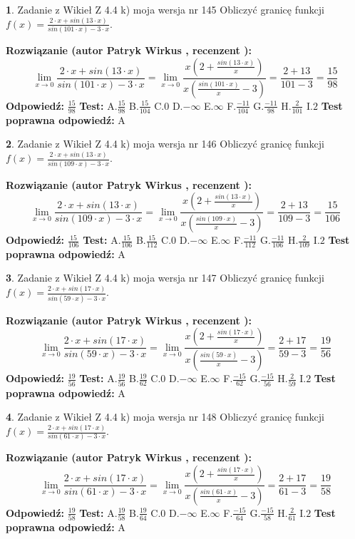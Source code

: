 \documentclass[12pt, a4paper]{article}
\theoremstyle{definition} %
\newtheorem{zad}{}
\newcommand{\zadStart}[1]{\begin{zad}#1\newline}
\newcommand{\zadStop}{\end{zad}}
\newcommand{\rozwStart}[2]{\noindent \textbf{Rozwiązanie (autor #1 , recenzent #2): }\newline}
\newcommand{\rozwStop}{\newline}
\newcommand{\odpStart}{\noindent \textbf{Odpowiedź:}\newline}
\newcommand{\odpStop}{\newline}
\newcommand{\testStart}{\noindent \textbf{Test:}\newline}
\newcommand{\testStop}{\newline}
\newcommand{\kluczStart}{\noindent \textbf{Test poprawna odpowiedź:}\newline}
\newcommand{\kluczStop}{\newline}
\begin{document}
\zadStart{Zadanie z Wikieł Z 4.4 k) moja wersja nr 145}
Obliczyć granicę funkcji $f(x)=\frac{2\cdot x +sin(13\cdot x)}{sin(101\cdot x) -3\cdot x}$.
\zadStop
\rozwStart{Patryk Wirkus}{}
$$\lim\limits_{x\to 0}\frac{2\cdot x +sin(13\cdot x)}{sin(101\cdot x) -3\cdot x}
=\lim\limits_{x\to 0}\frac{x(2+\frac{sin(13\cdot x)}{x})}{x(\frac{sin(101\cdot x)}{x}-3)}
=\frac{2+13}{101-3} = \frac{15}{98}$$
\rozwStop
\odpStart
$\frac{15}{98}$
\odpStop
\testStart
A.$\frac{15}{98}$
B.$\frac{15}{104}$
C.$0$
D.$-\infty$
E.$\infty$
F.$\frac{-11}{104}$
G.$\frac{-11}{98}$
H.$\frac{2}{101}$
I.$2$
\testStop
\kluczStart
A
\kluczStop



\zadStart{Zadanie z Wikieł Z 4.4 k) moja wersja nr 146}
Obliczyć granicę funkcji $f(x)=\frac{2\cdot x +sin(13\cdot x)}{sin(109\cdot x) -3\cdot x}$.
\zadStop
\rozwStart{Patryk Wirkus}{}
$$\lim\limits_{x\to 0}\frac{2\cdot x +sin(13\cdot x)}{sin(109\cdot x) -3\cdot x}
=\lim\limits_{x\to 0}\frac{x(2+\frac{sin(13\cdot x)}{x})}{x(\frac{sin(109\cdot x)}{x}-3)}
=\frac{2+13}{109-3} = \frac{15}{106}$$
\rozwStop
\odpStart
$\frac{15}{106}$
\odpStop
\testStart
A.$\frac{15}{106}$
B.$\frac{15}{112}$
C.$0$
D.$-\infty$
E.$\infty$
F.$\frac{-11}{112}$
G.$\frac{-11}{106}$
H.$\frac{2}{109}$
I.$2$
\testStop
\kluczStart
A
\kluczStop



\zadStart{Zadanie z Wikieł Z 4.4 k) moja wersja nr 147}
Obliczyć granicę funkcji $f(x)=\frac{2\cdot x +sin(17\cdot x)}{sin(59\cdot x) -3\cdot x}$.
\zadStop
\rozwStart{Patryk Wirkus}{}
$$\lim\limits_{x\to 0}\frac{2\cdot x +sin(17\cdot x)}{sin(59\cdot x) -3\cdot x}
=\lim\limits_{x\to 0}\frac{x(2+\frac{sin(17\cdot x)}{x})}{x(\frac{sin(59\cdot x)}{x}-3)}
=\frac{2+17}{59-3} = \frac{19}{56}$$
\rozwStop
\odpStart
$\frac{19}{56}$
\odpStop
\testStart
A.$\frac{19}{56}$
B.$\frac{19}{62}$
C.$0$
D.$-\infty$
E.$\infty$
F.$\frac{-15}{62}$
G.$\frac{-15}{56}$
H.$\frac{2}{59}$
I.$2$
\testStop
\kluczStart
A
\kluczStop



\zadStart{Zadanie z Wikieł Z 4.4 k) moja wersja nr 148}
Obliczyć granicę funkcji $f(x)=\frac{2\cdot x +sin(17\cdot x)}{sin(61\cdot x) -3\cdot x}$.
\zadStop
\rozwStart{Patryk Wirkus}{}
$$\lim\limits_{x\to 0}\frac{2\cdot x +sin(17\cdot x)}{sin(61\cdot x) -3\cdot x}
=\lim\limits_{x\to 0}\frac{x(2+\frac{sin(17\cdot x)}{x})}{x(\frac{sin(61\cdot x)}{x}-3)}
=\frac{2+17}{61-3} = \frac{19}{58}$$
\rozwStop
\odpStart
$\frac{19}{58}$
\odpStop
\testStart
A.$\frac{19}{58}$
B.$\frac{19}{64}$
C.$0$
D.$-\infty$
E.$\infty$
F.$\frac{-15}{64}$
G.$\frac{-15}{58}$
H.$\frac{2}{61}$
I.$2$
\testStop
\kluczStart
A
\kluczStop
\end{document}
